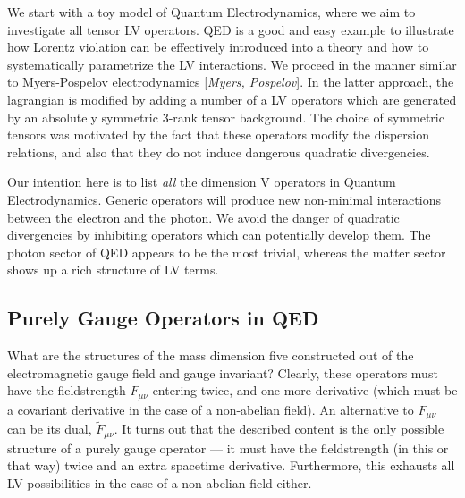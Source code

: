 \documentclass[12pt]{revtex4}
\begin{document}
	We start with a toy model of Quantum Electrodynamics, where we
	aim to investigate all tensor LV operators.
	QED is a good and easy example to illustrate how Lorentz violation 
	can be effectively introduced into a theory and how to 
	systematically parametrize the LV interactions.
	We proceed in the manner similar to
	Myers-Pospelov electrodynamics [{\it Myers, Pospelov}].
	In the latter approach, the lagrangian is modified by adding
	a number of a LV operators which are generated by an absolutely
	symmetric 3-rank tensor background.
	The choice of symmetric tensors was motivated by the fact that
	these operators modify the dispersion relations, and also that
	they do not induce dangerous quadratic divergencies.

	Our intention here is to list {\it all} the dimension V operators in 
	Quantum Electrodynamics. 
	Generic operators will produce new non-minimal interactions between
	the electron and the photon. 
	We avoid the danger of quadratic divergencies by inhibiting operators
	which can potentially develop them.
	The photon sector of QED appears to be the most trivial, whereas
	the matter sector shows up a rich structure of LV terms.

\subsection{Purely Gauge Operators in QED}

	What are the structures of the mass dimension five 
	constructed out of the
	electromagnetic gauge field and gauge invariant?
	Clearly, these operators must have the fieldstrength 
$ F_{\mu\nu} $
	entering twice, and one more derivative (which must be a covariant
	derivative in the case of a non-abelian field).
	An alternative to $ F_{\mu\nu} $ can be its dual, 
$ \widetilde{F}_{\mu\nu} $.
	It turns out that the described content is the only possible
	structure of a purely gauge operator --- it must have the
	fieldstrength (in this or that way) twice and an extra spacetime
	derivative.
	Furthermore, this exhausts all LV possibilities in the case
	of a non-abelian field either. 
\end{document}
